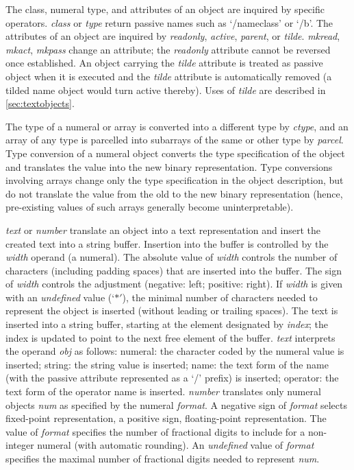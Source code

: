 
The  class,  numeral type,  and attributes of an object are  inquired by specific operators. \emph{class} or  \emph{type} return passive names such as  `/nameclass'  or  `/b'. The attributes of an object are inquired by \emph{readonly}, \emph{active}, \emph{parent}, or \emph{tilde}.  \emph{mkread}, \emph{mkact}, \emph{mkpass} change an attribute; the \emph{readonly} attribute cannot be reversed once established. An object carrying the \emph{tilde} attribute is treated as passive object when it is executed and the \emph{tilde} attribute is automatically removed (a tilded name object would turn active thereby). Uses of \emph{tilde} are described in \ref{sec:textobjects}.

The  type  of  a  numeral or array is converted  into  a  different  type by \emph{ctype},  and an array of any type is parcelled into subarrays of the same or other type by \emph{parcel}.  Type conversion of a numeral object converts  the type  specification  of the object and translates the value into  the  new binary representation.  Type conversions involving arrays change only  the type  specification in the object description,  but do not  translate  the value from the old to the new binary representation  (hence,  pre-existing values of such arrays generally become uninterpretable).

\emph{text} or \emph{number} translate an object into a text representation and insert the created text into a string buffer. Insertion into the buffer is controlled by the \emph{width} operand (a numeral). The absolute value of \emph{width} controls the number of characters (including padding spaces) that are inserted into the buffer. The sign of \emph{width} controls the adjustment (negative: left; positive: right). If \emph{width} is given with an \emph{undefined} value (`$\ast'$), the minimal number of characters needed to represent the object is inserted (without leading or trailing spaces). The text is inserted into a string buffer, starting at the element designated by \emph{index}; the index is updated to point to the next free element of the buffer. \emph{text} interprets the operand \emph{obj} as follows: numeral: the character coded by the numeral value is inserted; string: the string value is inserted; name: the text form of the name (with the passive attribute represented as a `/' prefix) is inserted; operator: the text form of the operator name is inserted. \emph{number} translates only numeral objects \emph{num} as specified by the numeral \emph{format}. A negative sign of \emph{format} selects fixed-point representation, a positive sign, floating-point representation. The value of \emph{format} specifies the number of fractional digits to include for a non-integer numeral (with automatic rounding). An \emph{undefined} value of \emph{format} specifies the maximal number of fractional digits needed to represent \emph{num}. 

